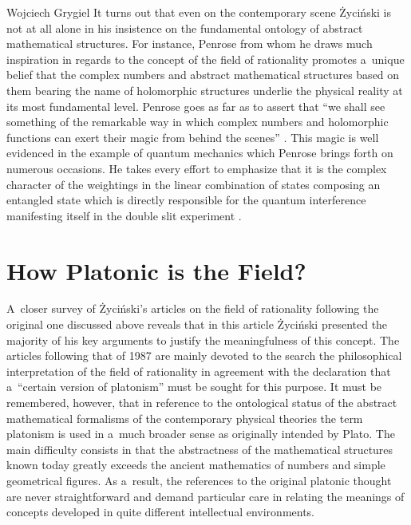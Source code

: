 \begin{artengenv}{Wojciech Grygiel}
It turns out that even on the contemporary scene Życiński is not at all alone in his insistence on the fundamental ontology of abstract mathematical structures. For instance, Penrose from whom he draws much inspiration in regards to the concept of the field of rationality promotes a~unique belief that the complex numbers and abstract mathematical structures based on them bearing the name of holomorphic structures underlie the physical reality at its most fundamental level. Penrose goes as far as to assert that ``we shall see something of the remarkable way in which complex numbers and holomorphic functions can exert their magic from behind the scenes''
\parencite[][p.151]{penrose_road_2005}. %
 This magic is well evidenced in the example of quantum mechanics which Penrose brings forth on numerous occasions. He takes every effort to emphasize that it is the complex character of the weightings in the linear combination of states composing an entangled state which is directly responsible for the quantum interference manifesting itself in the double slit experiment 
\parencites[][pp.236–242]{penrose_emperors_1989}[][pp.50–92]{penrose_large_1997}[][pp.553–559]{penrose_road_2005}.%


\section{How Platonic is the Field?}
A~closer survey of Życiński's articles on the field of rationality following the original one discussed above
\parencite[][]{zycinski_filozoficzne_1987} %
 reveals that in this article Życiński presented the majority of his key arguments to justify the meaningfulness of this concept. The articles following that of 1987 are mainly devoted to the search the philosophical interpretation of the field of rationality in agreement with the declaration that a~``certain version of platonism'' must be sought for this purpose. It must be remembered, however, that in reference to the ontological status of the abstract mathematical formalisms of the contemporary physical theories the term platonism is used in a~much broader sense as originally intended by Plato. The main difficulty consists in that the abstractness of the mathematical structures known today greatly exceeds the ancient mathematics of numbers and simple geometrical figures. As a~result, the references to the original platonic thought are never straightforward and demand particular care in relating the meanings of concepts developed in quite different intellectual environments.


\end{artengenv}
